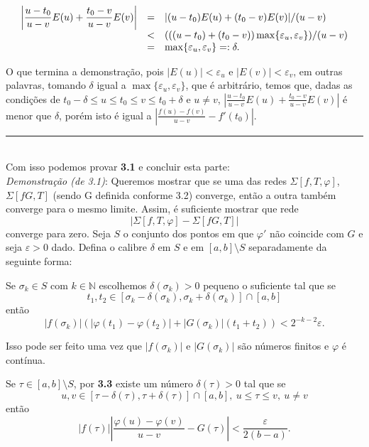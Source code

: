 \documentclass[12pt, a4paper]{article}
\def\eop{\hfill\rule{2.5mm}{2.5mm}}
\theoremstyle{definition}
\begin{document}
$$ \begin{array}{lll}
	 \displaystyle\left |\displaystyle\frac{u-t_0}{u-v}E(u)+\displaystyle\frac{t_0-v}{u-v}E(v)\displaystyle\right|  & = &    |(u-t_0)E(u)+(t_0-v)E(v)| /(u-v)  \\
	\ & < & (((u-t_0)+(t_0-v))\max \{ \varepsilon_u,\varepsilon_v \})/(u-v) \\
	\ & = & \max \{ \varepsilon_u,\varepsilon_v \}=:\delta.
\end{array} $$ 

O que termina a demonstração, pois $|E(u)|<\varepsilon_u$ e $|E(v)|<\varepsilon_v$, em outras palavras, tomando $\delta$ igual a $ \max \{ \varepsilon_u,\varepsilon_v \}$, que é arbitrário, temos que, dadas as condições de $t_0-\delta\leq u\leq t_0 \leq v \leq t_0 +\delta$ e $u\neq v$, $\left |\frac{u-t_0}{u-v}E(u)+\frac{t_0-v}{u-v}E(v)\right|$ é menor que $\delta$, porém isto é igual a $\left|\frac{f(u)-f(v)}{u-v} - f'(t_0)\right|$. \eop \\

Com isso podemos provar \textbf{3.1} e concluir esta parte: \\

\textit{Demonstração (de 3.1)}: Queremos mostrar que se uma das redes $\Sigma [f,T,\varphi]$, $\Sigma [fG,T]$ (sendo G definida conforme 3.2) converge, então a outra também converge para o mesmo limite. Assim, é suficiente mostrar que rede $$\left| \Sigma [f,T,\varphi] - \Sigma [fG,T] \right|$$ converge para zero. Seja $S$ o conjunto dos pontos em que $\varphi '$ não coincide com $G$ e seja $\varepsilon > 0$ dado. Defina o calibre $\delta$ em $S$ e em $[a,b]\setminus S$ separadamente da seguinte forma: 

Se $\sigma_k\in S$ com $k\in\mathbb{N}$ escolhemos $\delta(\sigma_k)>0$ pequeno o suficiente tal que se $$t_1,t_2\in [\sigma_k-\delta(\sigma_k),\sigma_k+\delta(\sigma_k)]\cap [a,b]$$ então $$|f(\sigma_k)|\left( |\varphi(t_1)-\varphi(t_2)|+|G(\sigma_k)|(t_1+t_2) \right)<2^{-k-2}\varepsilon. $$

Isso pode ser feito uma vez que $|f(\sigma_k)|$ e $|G(\sigma_k)|$ são números finitos e $\varphi$ é contínua.

Se $\tau\in [a,b]\setminus S$, por \textbf{3.3} existe um número $\delta(\tau)>0$ tal que se $$u,v\in [\tau-\delta(\tau), \tau+\delta(\tau)]\cap [a,b], \ u\leq \tau \leq v, \ u\neq v$$ então $$|f(\tau)|\left| \frac{\varphi(u)-\varphi(v)}{u-v} - G(\tau) \right|< \frac{\varepsilon}{2(b-a)}. $$
\end{document}
